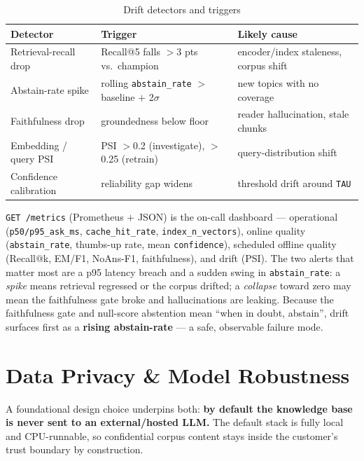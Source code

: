 \documentclass[12pt,a4paper]{article}
\begin{document}
\begin{table}[H]
\centering
\caption{Drift detectors and triggers}
\small
\begin{tabularx}{\linewidth}{@{} l L l @{}}
\toprule
\textbf{Detector} & \textbf{Trigger} & \textbf{Likely cause} \\
\midrule
Retrieval-recall drop & Recall@5 falls $>$3 pts vs.\ champion & encoder/index staleness, corpus shift \\
Abstain-rate spike & rolling \texttt{abstain\_rate} $>$ baseline $+$ 2$\sigma$ & new topics with no coverage \\
Faithfulness drop & groundedness below floor & reader hallucination, stale chunks \\
Embedding / query PSI & PSI $>$0.2 (investigate), $>$0.25 (retrain) & query-distribution shift \\
Confidence calibration & reliability gap widens & threshold drift around \texttt{TAU} \\
\bottomrule
\end{tabularx}
\end{table}

\noindent \texttt{GET /metrics} (Prometheus $+$ JSON) is the on-call dashboard --- operational (\texttt{p50/p95\_ask\_ms}, \texttt{cache\_hit\_rate}, \texttt{index\_n\_vectors}), online quality (\texttt{abstain\_rate}, thumbs-up rate, mean \texttt{confidence}), scheduled offline quality (Recall@k, EM/F1, NoAns-F1, faithfulness), and drift (PSI). The two alerts that matter most are a p95 latency breach and a sudden swing in \texttt{abstain\_rate}: a \emph{spike} means retrieval regressed or the corpus drifted; a \emph{collapse} toward zero may mean the faithfulness gate broke and hallucinations are leaking. Because the faithfulness gate and null-score abstention mean ``when in doubt, abstain'', drift surfaces first as a \textbf{rising abstain-rate} --- a safe, observable failure mode.

\section{Data Privacy \& Model Robustness}

A foundational design choice underpins both: \textbf{by default the knowledge base is never sent to an external/hosted LLM.} The default stack is fully local and CPU-runnable, so confidential corpus content stays inside the customer's trust boundary by construction.
\end{document}
